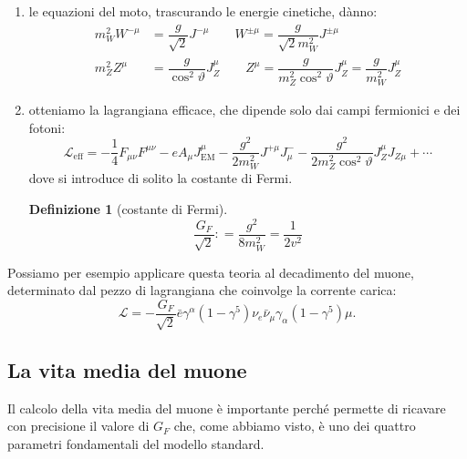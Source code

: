 \documentclass[italian,a4paper]{article}
\theoremstyle{definition}
\newtheorem*{definition}{Definizione}
\newcommand{\lagr}{\ensuremath{\mathscr{L}}}
\renewcommand{\theta}{\vartheta}
\begin{document}
\begin{enumerate}
    \item le equazioni del moto, trascurando le energie cinetiche, d\`anno:
        \begin{align*}
            m_W^2 W^{-\mu} &= \dfrac{g}{\sqrt{2}}J^{- \mu}
             \qquad W^{\pm \mu} = \dfrac{g}{\sqrt{2}m_W^2} J^{\pm \mu}\\
            m_Z^2 Z^{\mu} &= \dfrac{g}{\cos^2 \theta}J_Z^{\mu}
             \qquad Z^{\mu} = \dfrac{g}{m_Z^2 \cos^2\theta} J^{\mu}_Z
             =\dfrac{g}{m_W^2} J^{\mu}_Z  
        \end{align*}
    \item otteniamo la lagrangiana efficace, che dipende solo dai campi
        fermionici e dei fotoni:
        \begin{equation*}
            \lagr_{\text{eff}} =
            -\dfrac{1}{4}F_{\mu\nu}F^{\mu\nu}
            - e A_\mu J^\mu_{\text{EM}}
            - \dfrac{g^2}{2m_W^2} J^{+\mu}J_\mu^-
            - \dfrac{g^2}{2m_Z^2 \cos^2\theta} J_Z^\mu J_{Z\mu}
            + \cdots
        \end{equation*}
        dove si introduce di solito la costante di Fermi.
        \begin{definition}
            [costante di Fermi]
            \begin{equation*}
                \dfrac{G_F}{\sqrt{2}} \mathop: = \dfrac{g^2}{8m_W^2} =
                \dfrac{1}{2 v^2}
            \end{equation*}
        \end{definition}
\end{enumerate}
Possiamo per esempio applicare questa teoria al decadimento del muone,
determinato dal pezzo di lagrangiana che coinvolge la corrente carica:
\begin{equation*}
    \lagr = -\dfrac{G_F}{\sqrt{2}}\bar{e} \gamma^\alpha(1 - \gamma^5) \nu_e
   \bar{\nu}_\mu\gamma_\alpha(1 - \gamma^5) \mu.
\end{equation*}
\subsection{La vita media del muone}
Il calcolo della vita media del muone \`e importante perch\'e permette di
ricavare con precisione il valore di $G_F$ che, come abbiamo visto, \`e uno
dei quattro parametri fondamentali del modello standard.
\end{document}
